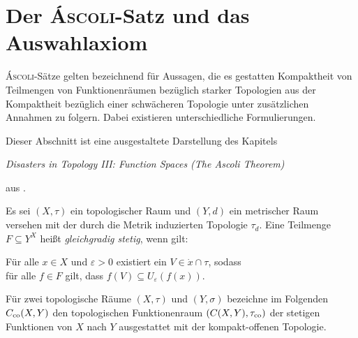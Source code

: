 \chapter{Der \textsc{Áscoli}-Satz und das Auswahlaxiom}

\textsc{Áscoli}-Sätze gelten bezeichnend für Aussagen, die es gestatten Kompaktheit von Teilmengen von Funktionenräumen bezüglich starker Topologien aus der Kompaktheit bezüglich einer schwächeren Topologie unter zusätzlichen Annahmen zu folgern. Dabei existieren unterschiedliche Formulierungen.

Dieser Abschnitt ist eine ausgestaltete Darstellung des Kapitels  
\begin{addmargin}[2em]{2em}%
  \textit{Disasters in Topology III: Function Spaces (The Ascoli Theorem)}
\end{addmargin}
aus \cite{herrlich2006axiom}. 


\begin{defn}
  Es sei $(X,\tau)$ ein topologischer Raum und $(Y,d)$ ein metrischer Raum versehen mit der durch die Metrik induzierten Topologie $\tau_d$. Eine Teilmenge $F \subseteq Y^X$ heißt \textit{gleichgradig stetig}, wenn gilt:
  \begin{addmargin}[2em]{2em}%
    Für alle $x \in X$ und $\varepsilon > 0$ existiert ein $V \in \dot{x} \cap \tau$, sodass \\
    für alle $f \in F$ gilt, dass $f(V) \subseteq U_\varepsilon(f(x))$.
  \end{addmargin}
\end{defn}

Für zwei topologische Räume $(X,\tau)$ und $(Y,\sigma)$ bezeichne im Folgenden $C_{\mathrm{co}}(X,Y)$ den topologischen Funktionenraum $(C(X,Y),\tau_{\mathrm{co}})$ der stetigen Funktionen von $X$ nach $Y$ ausgestattet mit der kompakt-offenen Topologie.

